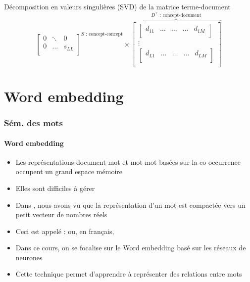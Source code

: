 \documentclass[xcolor=table]{beamer}
\begin{document}
\begin{frame}
\begin{block}{Décomposition en valeurs singulières (SVD) de la matrice terme-document}
\[{\begin{bmatrix}
			0 & \ddots & 0 \\
			0 & \ldots & s_{LL} \\
			\end{bmatrix}
		}^{S \text{ : concept-concept}}
		\times 
		\overbrace{
			\begin{bmatrix}
			\begin{bmatrix}
			d_{11} & \ldots & \ldots & \ldots & d_{1M} \\
			\end{bmatrix}\\
			\vdots \\
			\begin{bmatrix}
			d_{L1} & \ldots & \ldots & \ldots & d_{LM} \\
			\end{bmatrix}\\
			\end{bmatrix}
		}^{D^\top \text{ : concept-document}}
		\]
		
	\end{block}
	
\end{frame}


\section{Word embedding}

\begin{frame}
\frametitle{Sém. des mots}
\framesubtitle{Word embedding}

\begin{itemize}
	\item Les représentations document-mot et mot-mot basées sur la co-occurrence occupent un grand espace mémoire 
	\item Elles sont difficiles à gérer 
	\item Dans , nous avons vu que la représentation d'un mot est compactée vers un petit vecteur de nombres réels
	\item Ceci est appelé :  ou, en français, 
	\item Dans ce cours, on se focalise sur le Word embedding basé sur les réseaux de neurones
	\item Cette technique permet d'apprendre à représenter des relations entre mots
\end{itemize}

\end{frame}
\end{document}
